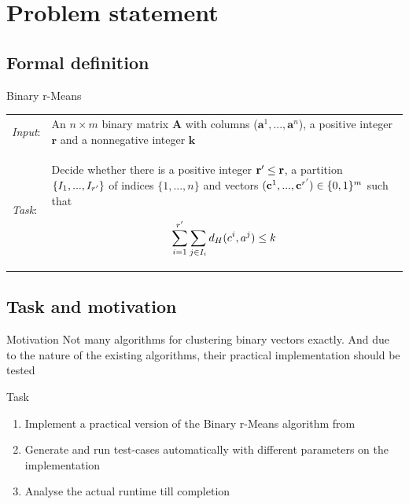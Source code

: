 \documentclass{beamer}
\begin{document}
\section{Problem statement}

\subsection{Formal definition}
\begin{frame}
  \begin{block}{Binary r-Means}
    \begin{tabular}{p{}p{}}
      \textit{Input}: & An $n \times m$ binary matrix \textbf{A} with columns
      ($\textbf{a}^1,...,\textbf{a}^n$), a positive integer $\textbf{r}$ and a nonnegative
      integer $\textbf{k}$                                                                     \\

      \pause

      \textit{Task}:  & Decide whether there is a positive integer $\textbf{r}\sp{\prime} \leq
        \textbf{r}$, a partition $\{I_1, ..., I_{r\sp{\prime}}\}$ of indices $\{1,...,n\}$ and vectors
      $(\textbf{c}^1,...,\textbf{c}^{r\sp{\prime}}) \in \{0,1\}^m$ such that

      \[
        \sum_{i = 1}^{r\sp{\prime}} \sum_{j \in I_i} d_H(c^i, a^j) \leq k
      \]
    \end{tabular}
  \end{block}
\end{frame}

\subsection{Task and motivation}
\begin{frame}
  \begin{block}{Motivation}
    Not many algorithms for clustering binary vectors exactly. And due to the
    nature of the existing algorithms, their practical implementation should be tested
  \end{block}

  \begin{block}{Task}
    \begin{enumerate}
      \item Implement a practical version of the \alert{Binary r-Means} algorithm from
            \cite{fomin_golovach_panolan_2020}
      \item Generate and run test-cases automatically with different parameters on
            the implementation
      \item Analyse the actual runtime till completion
    \end{enumerate}
  \end{block}
\end{frame}
\end{document}
